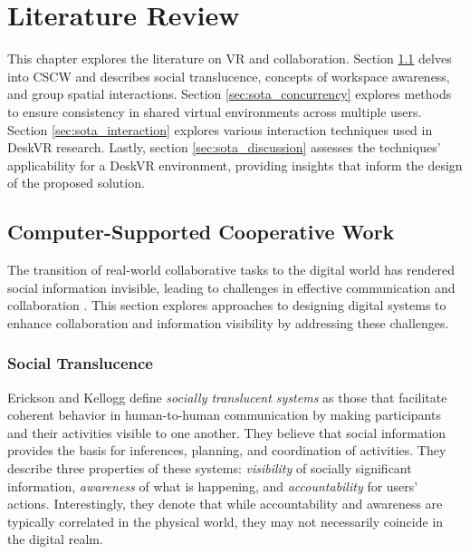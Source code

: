 \chapter{Literature Review} \label{chap:sota}

    This chapter explores the literature on VR and collaboration. Section \ref{sec:sota_social} delves into CSCW and describes social translucence, concepts of workspace awareness, and group spatial interactions. Section \ref{sec:sota_concurrency} explores methods to ensure consistency in shared virtual environments across multiple users. Section \ref{sec:sota_interaction} explores various interaction techniques used in DeskVR research. Lastly, section \ref{sec:sota_discussion} assesses the techniques' applicability for a DeskVR environment, providing insights that inform the design of the proposed solution.
    
\section{Computer-Supported Cooperative Work} \label{sec:sota_social}

    The transition of real-world collaborative tasks to the digital world has rendered social information invisible, leading to challenges in effective communication and collaboration \cite{ericksonSocialTranslucenceApproach2000}. This section explores approaches to designing digital systems to enhance collaboration and information visibility by addressing these challenges.

    \subsection{Social Translucence} \label{sec:sota_social_1}

    Erickson and Kellogg \cite{ericksonSocialTranslucenceApproach2000} define \textit{socially translucent systems} as those that facilitate coherent behavior in human-to-human communication by making participants and their activities visible to one another. They believe that social information provides the basis for inferences, planning, and coordination of activities. They describe three properties of these systems: \textit{visibility} of socially significant information, \textit{awareness} of what is happening, and \textit{accountability} for users' actions. Interestingly, they denote that while accountability and awareness are typically correlated in the physical world, they may not necessarily coincide in the digital realm.


